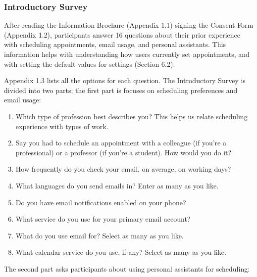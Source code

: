 \documentclass{article}
\begin{document}
\subsubsection{Introductory Survey}

After reading the Information Brochure (Appendix 1.1) signing the Consent Form (Appendix 1.2), participants answer 16 questions about their prior experience with scheduling appointments, email usage, and personal assistants. This information helps with understanding how users currently set appointments, and with setting the default values for settings (Section 6.2).

Appendix 1.3 lists all the options for each question. The Introductory Survey is divided into two parts; the first part is focuses on scheduling preferences and email usage:

\begin{enumerate}
	\item Which type of profession best describes you? This helps us relate scheduling experience with types of work.
	\item Say you had to schedule an appointment with a colleague (if you're a professional) or a professor (if you're a student). How would you do it?
	\item How frequently do you check your email, on average, on working days?
	\item What languages do you send emails in? Enter as many as you like.
	\item Do you have email notifications enabled on your phone?
	\item What service do you use for your primary email account?
	\item What do you use email for? Select as many as you like.
	\item What calendar service do you use, if any? Select as many as you like.
\end{enumerate}

The second part asks participants about using personal assistants for scheduling:
\end{document}
